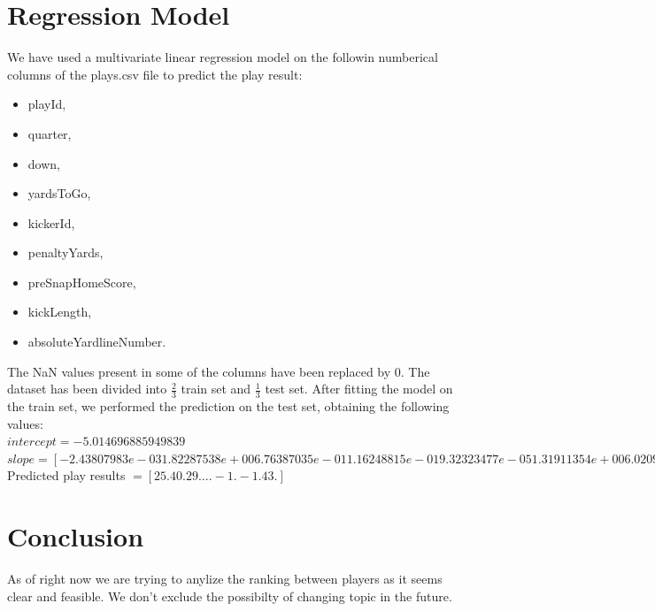 \documentclass{article}
\begin{document}
\section{Regression Model}
We have used a multivariate linear regression model on the followin numberical columns of the plays.csv file to predict the play result:
\begin{itemize}
	\item playId,
	\item quarter,
	\item down,
	\item yardsToGo,
	\item kickerId,
	\item penaltyYards,
	\item preSnapHomeScore,
	\item kickLength,
	\item absoluteYardlineNumber.
\end{itemize}
The NaN values present in some of the columns have been replaced by 0.
The dataset has been divided into $\frac{2}{3}$ train set and $\frac{1}{3}$ test set. After fitting the model on the train set, we performed the prediction on the test set, obtaining the following values:\\
$intercept = -5.014696885949839 $\\
$slope = [-2.43807983e-03  1.82287538e+00  6.76387035e-01  1.16248815e-01
  9.32323477e-05  1.31911354e+00  6.02097301e-02  5.91721982e-01
 -2.49419762e-03]$\\
Predicted play results $= [25. 40. 29. ... -1. -1. 43.]$
\section{Conclusion}
As of right now we are trying to anylize the ranking between players as it seems clear and feasible. We don't exclude the possibilty of changing topic in the future.
\end{document}
